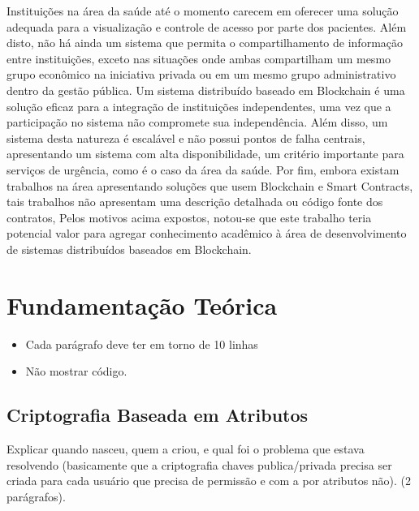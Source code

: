 \documentclass[a4paper,11pt]{article}
\begin{document}
Instituições na área da saúde até o momento carecem em oferecer uma solução adequada para a visualização e controle de acesso por parte dos pacientes.
Além disto, não há ainda um sistema que permita o compartilhamento de informação entre instituições, exceto nas situações onde ambas compartilham um mesmo grupo econômico na iniciativa privada ou em um mesmo grupo administrativo dentro da gestão pública.
Um sistema distribuído baseado em Blockchain é uma solução eficaz para a integração de instituições independentes, uma vez que a participação no sistema não compromete sua independência.
Além disso, um sistema desta natureza é escalável e não possui pontos de falha centrais, apresentando um sistema com alta disponibilidade, um critério importante para serviços de urgência, como é o caso da área da saúde.
Por fim, embora existam trabalhos na área apresentando soluções que usem Blockchain e Smart Contracts, tais trabalhos não apresentam uma descrição detalhada ou código fonte dos contratos,
Pelos motivos acima expostos, notou-se que este trabalho teria potencial valor para agregar conhecimento acadêmico à área de desenvolvimento de sistemas distribuídos baseados em Blockchain.

\newpage
\section{Fundamentação Teórica}

\begin{itemize}
    \item {\color{red}Cada parágrafo deve ter em torno de 10 linhas}
    \item {\color{red}Não mostrar código.}
\end{itemize}

\subsection{Criptografia Baseada em Atributos} \label{sec:sub:abe}

{\color{ForestGreen}Explicar quando nasceu, quem a criou, e qual foi o problema que estava resolvendo (basicamente que a criptografia chaves publica/privada precisa ser criada para cada usuário que precisa de permissão e com a por atributos não). (2 parágrafos).} %
\end{document}
